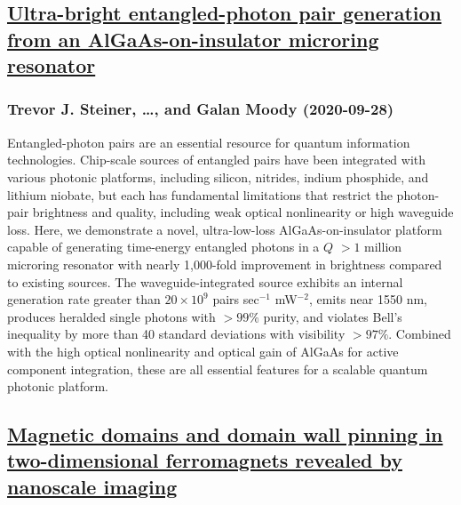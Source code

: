 \subsection*{\href{http://arxiv.org/abs/2009.13462v1}{Ultra-bright entangled-photon pair generation from an  AlGaAs-on-insulator microring resonator}}
\subsubsection*{Trevor J. Steiner, \dots, and Galan Moody (2020-09-28)}
Entangled-photon pairs are an essential resource for quantum information
technologies. Chip-scale sources of entangled pairs have been integrated with
various photonic platforms, including silicon, nitrides, indium phosphide, and
lithium niobate, but each has fundamental limitations that restrict the
photon-pair brightness and quality, including weak optical nonlinearity or high
waveguide loss. Here, we demonstrate a novel, ultra-low-loss
AlGaAs-on-insulator platform capable of generating time-energy entangled
photons in a $Q$ $>1$ million microring resonator with nearly 1,000-fold
improvement in brightness compared to existing sources. The
waveguide-integrated source exhibits an internal generation rate greater than
$20\times 10^9$ pairs sec$^{-1}$ mW$^{-2}$, emits near 1550 nm, produces
heralded single photons with $>99\%$ purity, and violates Bell's inequality by
more than 40 standard deviations with visibility $>97\%$. Combined with the
high optical nonlinearity and optical gain of AlGaAs for active component
integration, these are all essential features for a scalable quantum photonic
platform.

\subsection*{\href{http://arxiv.org/abs/2009.13440v1}{Magnetic domains and domain wall pinning in two-dimensional ferromagnets  revealed by nanoscale imaging}}
